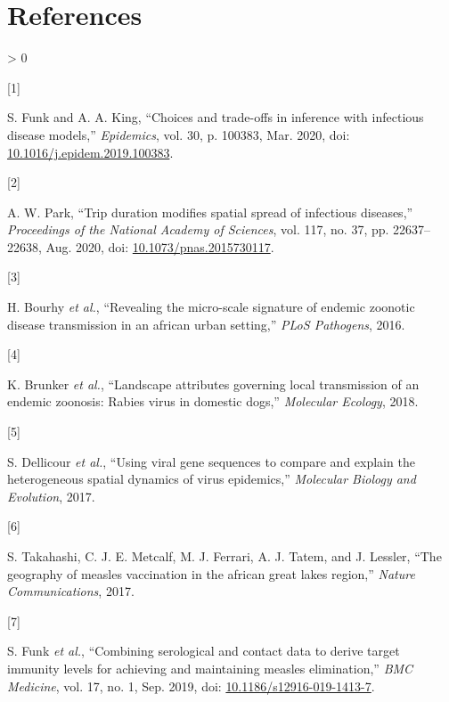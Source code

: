 \documentclass[
  oneside]{book}
\newlength{\cslhangindent}
\newlength{\csllabelwidth}
\newenvironment{CSLReferences}[2] %
 {%
  \setlength{\parindent}{0pt}
  \ifodd #1 \everypar{\setlength{\hangindent}{\cslhangindent}}\ignorespaces\fi
  \ifnum #2 > 0
  \setlength{\parskip}{#2\baselineskip}
  \fi
 }%
 {}
\newcommand{\CSLLeftMargin}[1]{\parbox[t]{\csllabelwidth}{#1}}
\newcommand{\CSLRightInline}[1]{\parbox[t]{\linewidth - \csllabelwidth}{#1}\break}
\begin{document}
\hypertarget{references-5}{%
\section{References}\label{references-5}}

\setlength{\parskip}{1em}

\hypertarget{refs_conc}{}
\begin{CSLReferences}{0}{0}
\leavevmode\hypertarget{ref-funk2020}{}%
\CSLLeftMargin{{[}1{]} }
\CSLRightInline{S. Funk and A. A. King, {``Choices and trade-offs in inference with infectious disease models,''} \emph{Epidemics}, vol. 30, p. 100383, Mar. 2020, doi: \href{https://doi.org/10.1016/j.epidem.2019.100383}{10.1016/j.epidem.2019.100383}.}

\leavevmode\hypertarget{ref-park2020}{}%
\CSLLeftMargin{{[}2{]} }
\CSLRightInline{A. W. Park, {``Trip duration modifies spatial spread of infectious diseases,''} \emph{Proceedings of the National Academy of Sciences}, vol. 117, no. 37, pp. 22637--22638, Aug. 2020, doi: \href{https://doi.org/10.1073/pnas.2015730117}{10.1073/pnas.2015730117}.}

\leavevmode\hypertarget{ref-bourhy2016}{}%
\CSLLeftMargin{{[}3{]} }
\CSLRightInline{H. Bourhy \emph{et al.}, {``Revealing the micro-scale signature of endemic zoonotic disease transmission in an african urban setting,''} \emph{PLoS Pathogens}, 2016.}

\leavevmode\hypertarget{ref-brunker2018}{}%
\CSLLeftMargin{{[}4{]} }
\CSLRightInline{K. Brunker \emph{et al.}, {``Landscape attributes governing local transmission of an endemic zoonosis: Rabies virus in domestic dogs,''} \emph{Molecular Ecology}, 2018.}

\leavevmode\hypertarget{ref-dellicour2017}{}%
\CSLLeftMargin{{[}5{]} }
\CSLRightInline{S. Dellicour \emph{et al.}, {``Using viral gene sequences to compare and explain the heterogeneous spatial dynamics of virus epidemics,''} \emph{Molecular Biology and Evolution}, 2017.}

\leavevmode\hypertarget{ref-takahashi2017}{}%
\CSLLeftMargin{{[}6{]} }
\CSLRightInline{S. Takahashi, C. J. E. Metcalf, M. J. Ferrari, A. J. Tatem, and J. Lessler, {``The geography of measles vaccination in the african great lakes region,''} \emph{Nature Communications}, 2017.}

\leavevmode\hypertarget{ref-funk2019}{}%
\CSLLeftMargin{{[}7{]} }
\CSLRightInline{S. Funk \emph{et al.}, {``Combining serological and contact data to derive target immunity levels for achieving and maintaining measles elimination,''} \emph{BMC Medicine}, vol. 17, no. 1, Sep. 2019, doi: \href{https://doi.org/10.1186/s12916-019-1413-7}{10.1186/s12916-019-1413-7}.}


\end{CSLReferences}
\end{document}
